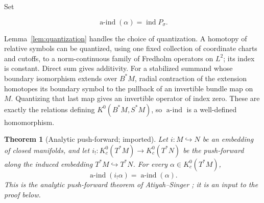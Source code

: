 \documentclass[11pt,oneside,reqno]{book}
\DeclareMathOperator{\ind}{ind}
\theoremstyle{plain}
\newtheorem{theorem}{Theorem}[chapter]
\theoremstyle{definition}
\theoremstyle{remark}
\begin{document}
Set

\[
 \operatorname{a\text{-}ind}(\alpha)=\ind P_\sigma.
\]

Lemma~\ref{lem:quantization} handles the choice of quantization.  A homotopy of relative
symbols can be quantized, using one fixed collection of coordinate charts
and cutoffs, to a norm-continuous family of Fredholm operators on \(L^2\);
its index is constant.  Direct sum gives additivity.  For a stabilized
summand whose boundary isomorphism extends over \(B^*M\), radial contraction
of the extension homotopes its boundary symbol to the pullback of an
invertible bundle map on \(M\).  Quantizing that last map gives an invertible
operator of index zero.
These are exactly the relations defining \(K^0(B^*M,S^*M)\), so
\(\operatorname{a\text{-}ind}\) is a well-defined homomorphism.

\begin{theorem}[Analytic push-forward; imported]\label{thm:pushforward}
Let \(i:M\hookrightarrow N\) be an embedding of closed manifolds, and let
\(i_!:K_c^0(T^*M)\to K_c^0(T^*N)\) be the push-forward along the induced
embedding \(T^*M\hookrightarrow T^*N\). For
every \(\alpha\in K_c^0(T^*M)\),
\[
 \operatorname{a\text{-}ind}(i_!\alpha)
 =\operatorname{a\text{-}ind}(\alpha).
\]
This is the analytic push-forward theorem of Atiyah--Singer
\cite{ASI}; it is an input to the proof below.
\end{theorem}
\end{document}
